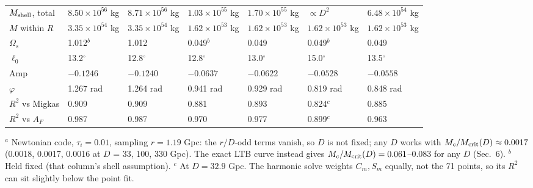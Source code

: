 \documentclass[10pt]{article}
\begin{document}
{\begin{center}
\begin{tabular}{lllllll}
$M_{\rm shell}$, total & $8.50{\times}10^{56}$ kg & $8.71{\times}10^{56}$ kg & $1.03{\times}10^{55}$ kg & $1.70{\times}10^{55}$ kg & $\propto D^2$ & $6.48{\times}10^{54}$ kg\\
$M$ within $R$ & $3.35{\times}10^{54}$ kg & $3.35{\times}10^{54}$ kg & $1.62{\times}10^{53}$ kg & $1.62{\times}10^{53}$ kg & $1.62{\times}10^{53}$ kg & $1.62{\times}10^{53}$ kg\\
$\Omega_s$ & 1.012$^b$ & 1.012 & 0.049$^b$ & 0.049 & 0.049$^b$ & 0.049\\
$\ell_0$ & 13.2$^\circ$ & 12.8$^\circ$ & 12.8$^\circ$ & 13.0$^\circ$ & 15.0$^\circ$ & 13.5$^\circ$\\
Amp & $-0.1246$ & $-0.1240$ & $-0.0637$ & $-0.0622$ & $-0.0528$ & $-0.0558$\\
$\varphi$ & 1.267 rad & 1.264 rad & 0.941 rad & 0.929 rad & 0.819 rad & 0.848 rad\\
$R^2$ vs Migkas & 0.909 & 0.909 & 0.881 & 0.893 & 0.824$^c$ & 0.885\\
$R^2$ vs $A_F$ & 0.987 & 0.987 & 0.970 & 0.977 & 0.899$^c$ & 0.963\\
\bottomrule
\end{tabular}\end{center}
\vspace{-3pt}
{\footnotesize $^a$ Newtonian code, $\tau_i=0.01$, sampling $r=1.19$ Gpc: the $r/D$-odd terms vanish, so $D$ is not fixed; any $D$ works with $M_c/M_{\rm crit}(D)\approx0.0017$ (0.0018, 0.0017, 0.0016 at $D$ = 33, 100, 330 Gpc). The exact LTB curve instead gives $M_c/M_{\rm crit}(D)=0.061$--0.083 for any $D$ (Sec.~6). $^b$ Held fixed (that column's shell assumption). $^c$ At $D=32.9$ Gpc. The harmonic solve weights $C_m,S_m$ equally, not the 71 points, so its $R^2$ can sit slightly below the point fit.}

}
\end{document}
